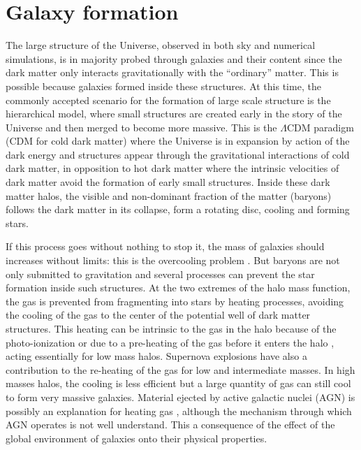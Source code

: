 \section{Galaxy formation}
\label{sec:galaxy_formation}

The large structure of the Universe, observed in both sky and numerical
simulations, is in majority probed through galaxies and their content since the
dark matter only interacts gravitationally with the ``ordinary'' matter. This
is possible because galaxies formed inside these structures. At this time, the
commonly accepted scenario for the formation of large scale structure is the
hierarchical model, where small structures are created early in the story of
the Universe and then merged to become more massive. This is the $\Lambda$CDM
paradigm (CDM for cold dark matter) where the Universe is in expansion by
action of the dark energy and structures appear through the gravitational
interactions of cold dark matter, in opposition to hot dark matter where the
intrinsic velocities of dark matter avoid the formation of early small
structures. Inside these dark matter halos, the visible and non-dominant
fraction of the matter (baryons) follows the dark matter in its collapse, form
a rotating disc, cooling and forming stars.

If this process goes without nothing to stop it, the mass of galaxies should
increases without limits: this is the overcooling problem \citep{White+78}. But
baryons are not only submitted to gravitation and several processes can prevent
the star formation inside such structures. At the two extremes of the halo mass
function, the gas is prevented from fragmenting into stars by heating
processes, avoiding the cooling of the gas to the center of the potential well
of dark matter structures. This heating can be intrinsic to the gas in the halo
because of the photo-ionization \citep{Rees+86} or due to a pre-heating of the
gas before it enters the halo \citep{Borgani+01}, acting essentially for low
mass halos. Supernova explosions have also a contribution to the re-heating of
the gas \citep{Dekel+86, Efstathiou+00} for low and intermediate masses. In
high masses halos, the cooling is less efficient but a large quantity of gas
can still cool to form very massive galaxies. Material ejected by active
galactic nuclei (AGN) is possibly an explanation for heating gas
\citep{Silk+98}, although the mechanism through which AGN operates is not well
understand. This a consequence of the effect of the global environment of
galaxies onto their physical properties.

